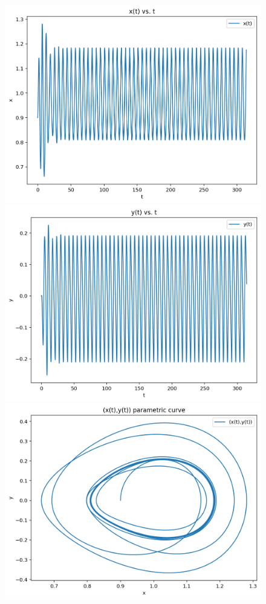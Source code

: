 \documentclass{article}
\begin{document}
\begin{figure}[h!]
\centering
\includegraphics[scale=0.4]{x(t)2.png}
\includegraphics[scale=0.4]{y(t)2.png}
\includegraphics[scale=0.4]{parametriccurve2.png}

\end{figure}
\end{document}

